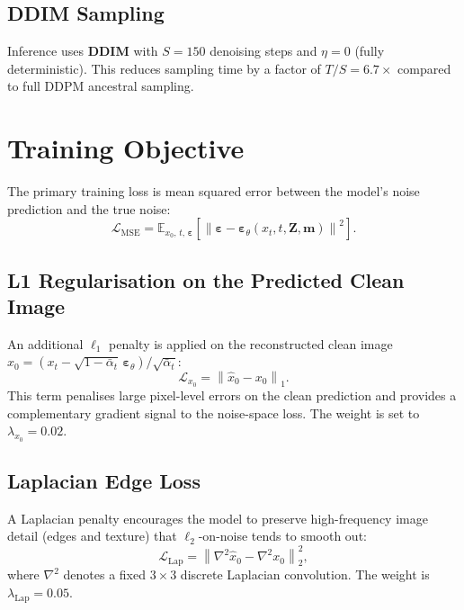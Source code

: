 \documentclass[12pt, a4paper, twoside]{report}
\newcommand{\eps}{\boldsymbol{\varepsilon}}
\newcommand{\calL}{\mathcal{L}}
\newcommand{\E}{\mathbb{E}}
\begin{document}
\subsection{DDIM Sampling}
\label{ssec:ddim_sampling}

Inference uses \textbf{DDIM} with $S = 150$ denoising steps and
$\eta = 0$ (fully deterministic).
This reduces sampling time by a factor of $T/S = 6.7\times$ compared to
full DDPM ancestral sampling.

\section{Training Objective}
\label{sec:training_objective}

The primary training loss is mean squared error between the model's noise
prediction and the true noise:
\begin{equation}
  \calL_{\text{MSE}} = \E_{x_0,\, t,\, \eps}\!\left[
    \left\|\eps - \eps_\theta(x_t, t, \mathbf{Z}, \mathbf{m})\right\|^2
  \right].
  \label{eq:mse_loss}
\end{equation}

\subsection{L1 Regularisation on the Predicted Clean Image}
\label{ssec:l1_loss}

An additional $\ell_1$ penalty is applied on the reconstructed clean image
$\hat{x}_0 = (x_t - \sqrt{1-\bar\alpha_t}\,\eps_\theta) / \sqrt{\bar\alpha_t}$:
\begin{equation}
  \calL_{x_0} = \left\|\hat{x}_0 - x_0\right\|_1.
  \label{eq:l1_loss}
\end{equation}
This term penalises large pixel-level errors on the clean prediction and
provides a complementary gradient signal to the noise-space loss.
The weight is set to $\lambda_{x_0} = 0.02$.

\subsection{Laplacian Edge Loss}
\label{ssec:laplacian_loss}

A Laplacian penalty encourages the model to preserve high-frequency image
detail (edges and texture) that $\ell_2$-on-noise tends to smooth out:
\begin{equation}
  \calL_{\text{Lap}} =
    \left\|\nabla^2 \hat{x}_0 - \nabla^2 x_0\right\|^2_2,
  \label{eq:lap_loss}
\end{equation}
where $\nabla^2$ denotes a fixed $3 \times 3$ discrete Laplacian convolution.
The weight is $\lambda_{\text{Lap}} = 0.05$.
\end{document}
